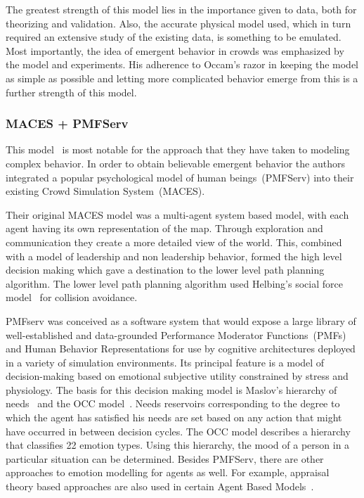 The greatest strength of this model lies in the importance given to data, both for theorizing and validation. Also, the accurate physical model used, which in turn required an extensive study of the existing data, is something to be emulated. Most importantly, the idea of emergent behavior in crowds was emphasized by the model and experiments. His adherence to Occam's razor in keeping the model as simple as possible and letting more complicated behavior emerge from this is a further strength of this model.


\subsubsection{MACES + PMFServ}
\label{MACESPMFServ}

This model~\cite{Pelechano:2005vp} is most notable for the approach that they have taken to modeling complex behavior. In order to obtain believable emergent behavior the authors integrated a popular psychological model of human beings~(PMFServ) into their existing Crowd Simulation System~(MACES).

Their original MACES model was a multi-agent system based model, with each agent having its own representation of the map. Through exploration and communication they create a more detailed view of the world. This, combined with a model of leadership and non leadership behavior, formed the high level decision making which gave a destination to the lower level path planning algorithm. The lower level path planning algorithm used Helbing's social force model~\cite{Helbing:1995ie} for collision avoidance.

PMFserv was conceived as a software system that would expose a large library of well-established and data-grounded Performance Moderator Functions~(PMFs) and Human Behavior Representations for use by cognitive architectures deployed in a variety of simulation environments. Its principal feature is a model of decision-making based on emotional subjective utility constrained by stress and physiology. The basis for this decision making model is Maslov's hierarchy of needs~\cite{Maslow:1943vr} and the OCC model~\cite{Orton:1990tx}. Needs reservoirs corresponding to the degree to which the agent has satisfied his needs are set based on any action that might have occurred in between decision cycles. The OCC model describes a hierarchy that classifies 22 emotion types. Using this hierarchy, the mood of a person in a particular situation can be determined. Besides PMFServ, there are other approaches to emotion modelling for agents as well. For example, appraisal theory based approaches are also used in certain Agent Based Models~\cite{Aydt:2011wz}.


